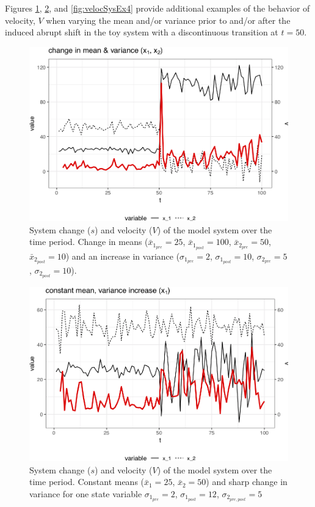 \documentclass[print]{nuthesis}
\begin{document}
Figures \ref{fig:velocSysEx2}, \ref{fig:velocSysEx3}, and \ref{fig:velocSysEx4} provide additional examples of the behavior of velocity, \(V\) when varying the mean and/or variance prior to and/or after the induced abrupt shift in the toy system with a discontinuous transition at \(t=50\).
\begin{figure}
\includegraphics[width=0.85\linewidth]{./chapterFiles/velocity/figsCalledInDiss/velocSysEx2} \caption{System change ($s$) and velocity ($V$) of the model system over the time period. Change in means ($\bar{x}_{1_{pre}}=25$, $\bar{x}_{1_{post}}=100$, $\bar{x}_{2_{pre}}=50$, $\bar{x}_{2_{post}}=10$) and an increase in variance ($\sigma_{1_{pre}}=2$, $\sigma_{1_{post}}=10$, $\sigma_{2_{pre}}=5$,  $\sigma_{2_{post}}=10$).}\label{fig:velocSysEx2}
\end{figure}
\newpage
\begin{figure}
\includegraphics[width=0.85\linewidth]{./chapterFiles/velocity/figsCalledInDiss/velocSysEx3} \caption{System change ($s$) and velocity ($V$) of the model system over the time period. Constant means ($\bar{x}_1=25$, $\bar{x}_2=50$) and sharp change in variance for one state variable $\sigma_{1_{pre}} = 2$, $\sigma_{1_{post}} = 12$, $\sigma_{2_{pre,post}} = 5$}\label{fig:velocSysEx3}
\end{figure}
\end{document}
